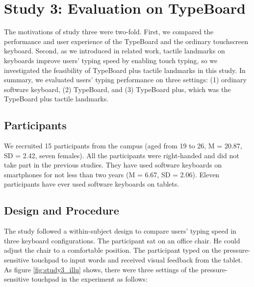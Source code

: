 \section{Study 3: Evaluation on TypeBoard}

The motivations of study three were two-fold. First, we compared the performance and user experience of the TypeBoard and the ordinary touchscreen keyboard. Second, as we introduced in related work, tactile landmarks on keyboards improve users' typing speed by enabling touch typing, so we investigated the feasibility of TypeBoard plus tactile landmarks in this study. In summary, we evaluated users' typing performance on three settings: (1) ordinary software keyboard, (2) TypeBoard, and (3) TypeBoard plus, which was the TypeBoard plus tactile landmarks.


\subsection{Participants}

We recruited 15 participants from the campus (aged from 19 to 26, M = 20.87, SD = 2.42, seven females). All the participants were right-handed and did not take part in the previous studies. They have used software keyboards on smartphones for not less than two years (M = 6.67, SD = 2.06). Eleven participants have ever used software keyboards on tablets.

\subsection{Design and Procedure}

The study followed a within-subject design to compare users' typing speed in three keyboard configurations. The participant sat on an office chair. He could adjust the chair to a comfortable position. The participant typed on the pressure-sensitive touchpad to input words and received visual feedback from the tablet. As figure \ref{fig:study3_illu} shows, there were three settings of the pressure-sensitive touchpad in the experiment as follows:

